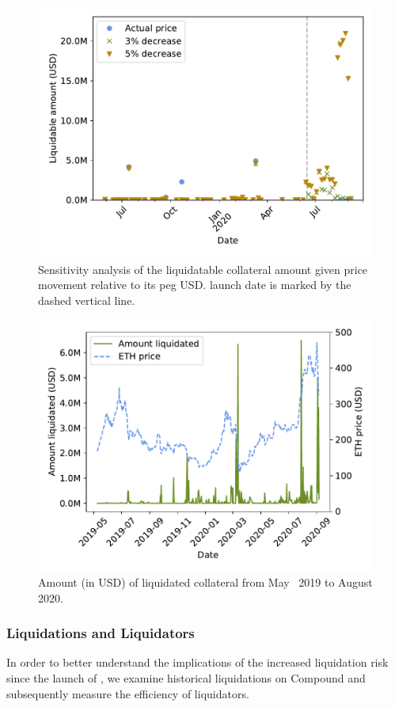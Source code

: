 \begin{figure}[tb]
  \centering
  \includegraphics[width=.7\textwidth]{./5b-economic-security/figures/dai-sensitivity.pdf}
  \caption[Sensitivity analysis of the liquidatable collateral amount]{Sensitivity analysis of the liquidatable collateral amount given  price movement relative to its peg USD.  launch date is marked by the dashed vertical line.}
  \label{fig:price-sensitivity}
\end{figure}

\begin{figure}[tb]
  \centering
  \includegraphics[width=.7\textwidth]{./5b-economic-security/figures/liquidation-over-time.pdf}
  \caption{Amount (in USD) of liquidated collateral from May ~2019 to August 2020.}
  \label{fig:liquidations-over-time}
\end{figure}

\subsubsection{Liquidations and Liquidators}
In order to better understand the implications of the increased liquidation risk since the launch of , we examine historical liquidations on Compound and subsequently measure the efficiency of liquidators.

